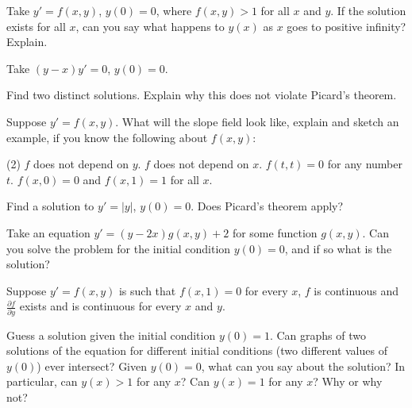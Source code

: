 \begin{exercise}[challenging]
Take $y' = f(x,y)$, $y(0) = 0$, where $f(x,y) > 1$
for all $x$ and $y$.  If
the solution exists for all $x$, can you say
what happens to $y(x)$ as $x$ goes to positive infinity?  Explain.
\end{exercise}

\begin{exercise}[challenging]
Take $(y-x)y' = 0$, $y(0) = 0$.
\begin{tasks}
\task Find two distinct solutions.
\task Explain why this does not violate Picard's theorem.
\end{tasks}
\end{exercise}

\begin{exercise}
Suppose $y' = f(x,y)$.  What will the slope field look like, explain and
sketch an example, if you know the following about $f(x,y)$:
\begin{tasks}(2)
\task $f$ does
not depend on $y$.
\task $f$ does not depend on $x$.
\task $f(t,t) = 0$ for any
number $t$.
\task $f(x,0) = 0$ and $f(x,1) = 1$ for all $x$.
\end{tasks}
\end{exercise}

\begin{exercise}
Find a solution to $y' = \lvert y \rvert$, $y(0) = 0$.  Does Picard's theorem apply?
\end{exercise}

\begin{exercise}
Take an equation $y' = (y-2x) g(x,y) + 2$ for some function $g(x,y)$.
Can you solve the problem for the
initial condition $y(0) = 0$,
and if so what is the solution?
\end{exercise}

\begin{exercise}[challenging]
\pagebreak[2]
Suppose $y' = f(x,y)$ is such that $f(x,1) = 0$ for every $x$,
$f$ is continuous and $\frac{\partial f}{\partial y}$ exists and
is continuous for every $x$ and $y$.
\begin{tasks}
\task
Guess a solution given the initial condition
$y(0) = 1$.
\task
Can graphs of two solutions of the equation for different initial conditions
(two different values of $y(0)$)
ever intersect?
\task
Given $y(0) = 0$, what can you say about the solution?
In particular,
can $y(x) > 1$ for any $x$?  Can $y(x) = 1$ for any $x$?
Why or why not?
\end{tasks}
\end{exercise}

